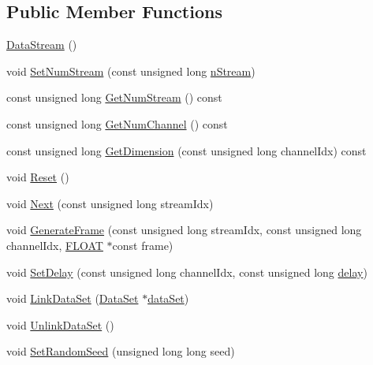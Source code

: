 \subsection*{Public Member Functions}
\begin{DoxyCompactItemize}
\item 
\hyperlink{classfractal_1_1DataStream_a5e0b49784823158039230c7e2f24dc38}{Data\+Stream} ()
\item 
void \hyperlink{classfractal_1_1DataStream_a9959a6264209e2bace1e27b942e40544}{Set\+Num\+Stream} (const unsigned long \hyperlink{classfractal_1_1DataStream_aad7f2cba4a0f2fde83daa29465f81d13}{n\+Stream})
\item 
const unsigned long \hyperlink{classfractal_1_1DataStream_a6a32912602f4fe4646c5a07b640ebfcf}{Get\+Num\+Stream} () const 
\item 
const unsigned long \hyperlink{classfractal_1_1DataStream_a17be66ba8094b0bf807938db2d4de684}{Get\+Num\+Channel} () const 
\item 
const unsigned long \hyperlink{classfractal_1_1DataStream_a65660493a4a750cc56d7521f48f76905}{Get\+Dimension} (const unsigned long channel\+Idx) const 
\item 
void \hyperlink{classfractal_1_1DataStream_aff176d1279fbd908dd4e5053877c8431}{Reset} ()
\item 
void \hyperlink{classfractal_1_1DataStream_afcd71486c0963a0b5bc3be09e9086ace}{Next} (const unsigned long stream\+Idx)
\item 
void \hyperlink{classfractal_1_1DataStream_ab77fa64192765973459f6d5602dbfd3a}{Generate\+Frame} (const unsigned long stream\+Idx, const unsigned long channel\+Idx, \hyperlink{namespacefractal_a1c2d2530689575d5ccb56bae52af70d3}{F\+L\+O\+A\+T} $\ast$const frame)
\item 
void \hyperlink{classfractal_1_1DataStream_a60b12892a760220814b78daade8375d1}{Set\+Delay} (const unsigned long channel\+Idx, const unsigned long \hyperlink{classfractal_1_1DataStream_aee0c7dd8635f71a1e1de54a420894b59}{delay})
\item 
void \hyperlink{classfractal_1_1DataStream_a8f0c3f1ba2567478f8b1ebdfe16592fd}{Link\+Data\+Set} (\hyperlink{classfractal_1_1DataSet}{Data\+Set} $\ast$\hyperlink{classfractal_1_1DataStream_a839fc0232b60bc2f7c156370d0e6f9db}{data\+Set})
\item 
void \hyperlink{classfractal_1_1DataStream_abe96c80dcab04602d4b9139ecc4f70c0}{Unlink\+Data\+Set} ()
\item 
void \hyperlink{classfractal_1_1DataStream_a26e50076d103ed6fb67697c78ea39f8c}{Set\+Random\+Seed} (unsigned long long seed)
\end{DoxyCompactItemize}
